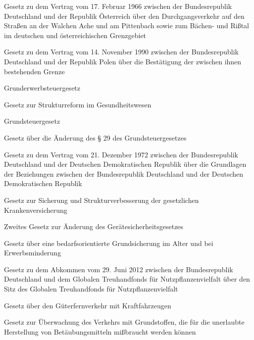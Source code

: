 \item[{GrenzVerkAUTVtrG-2}] Gesetz zu dem Vertrag vom 17. Februar 1966 zwischen der Bundesrepublik Deutschland und der Republik Österreich über den Durchgangsverkehr auf den Straßen an der Walchen Ache und am Pittenbach sowie zum Bächen- und Rißtal im deutschen und österreichischen Grenzgebiet

\item[{GrenzVtrPOLG}] Gesetz zu dem Vertrag vom 14. November 1990 zwischen der Bundesrepublik Deutschland und der Republik Polen über die Bestätigung der zwischen ihnen bestehenden Grenze

\item[{GrEStG-1983}] Grunderwerbsteuergesetz

\item[{GRG}] Gesetz zur Strukturreform im Gesundheitswesen

\item[{GrStG-1973}] Grundsteuergesetz

\item[{GrStG-29ÄndG}] Gesetz über die Änderung des § 29 des Grundsteuergesetzes

\item[{GrundVtrG}] Gesetz zu dem Vertrag vom 21. Dezember 1972 zwischen der Bundesrepublik Deutschland und der Deutschen Demokratischen Republik über die Grundlagen der Beziehungen zwischen der Bundesrepublik Deutschland und der Deutschen Demokratischen Republik

\item[{GSG}] Gesetz zur Sicherung und Strukturverbesserung der gesetzlichen Krankenversicherung

\item[{GSGÄndG-2}] Zweites Gesetz zur Änderung des Gerätesicherheitsgesetzes

\item[{GSiG}] Gesetz über eine bedarfsorientierte Grundsicherung im Alter und bei Erwerbsminderung

\item[{GTNSitzAbkG}] Gesetz zu dem Abkommen vom 29. Juni 2012 zwischen der Bundesrepublik Deutschland und dem Globalen Treuhandfonds für Nutzpflanzenvielfalt über den Sitz des Globalen Treuhandfonds für Nutzpflanzenvielfalt

\item[{GüFG}] Gesetz über den Güterfernverkehr mit Kraftfahrzeugen

\item[{GÜG}] Gesetz zur Überwachung des Verkehrs mit Grundstoffen, die für die unerlaubte Herstellung von Betäubungsmitteln mißbraucht werden können

